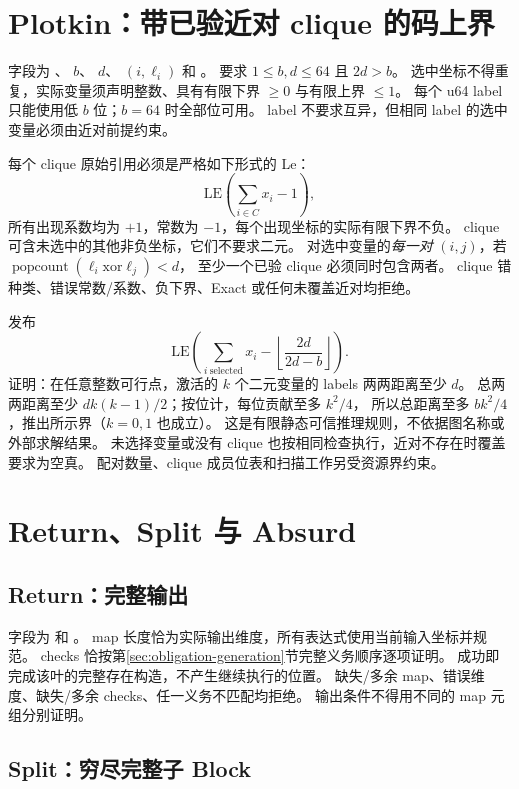 \section{Plotkin：带已验近对 clique 的码上界}
\label{ins:plotkin}

字段为 、 $b$、 $d$、
 $(i,\ell_i)$ 和 。
要求 $1\le b,d\le64$ 且 $2d>b$。
选中坐标不得重复，实际变量须声明整数、具有有限下界 $\ge0$ 与有限上界 $\le1$。
每个 u64 label 只能使用低 $b$ 位；$b=64$ 时全部位可用。
label 不要求互异，但相同 label 的选中变量必须由近对前提约束。

每个 clique 原始引用必须是严格如下形式的 Le：
\[
 \mathrm{LE}\left(\sum_{i\in C}x_i-1\right),
\]
所有出现系数均为 $+1$，常数为 $-1$，每个出现坐标的实际有限下界不负。
clique 可含未选中的其他非负坐标，它们不要求二元。
对选中变量的\emph{每一对} $(i,j)$，若
$\operatorname{popcount}(\ell_i\mathbin{\mathrm{xor}}\ell_j)<d$，
至少一个已验 clique 必须同时包含两者。
clique 错种类、错误常数/系数、负下界、Exact 或任何未覆盖近对均拒绝。

发布
\[
 \mathrm{LE}\left(\sum_{i\ \mathrm{selected}}x_i-
 \left\lfloor\frac{2d}{2d-b}\right\rfloor\right).
\]
证明：在任意整数可行点，激活的 $k$ 个二元变量的 labels 两两距离至少 $d$。
总两两距离至少 $dk(k-1)/2$；按位计，每位贡献至多 $k^2/4$，
所以总距离至多 $bk^2/4$，推出所示界（$k=0,1$ 也成立）。
这是有限静态可信推理规则，不依据图名称或外部求解结果。
未选择变量或没有 clique 也按相同检查执行，近对不存在时覆盖要求为空真。
配对数量、clique 成员位表和扫描工作另受资源界约束。

\section{Return、Split 与 Absurd}

\subsection{Return：完整输出}
\label{ins:return}
\label{ins:ret}

字段为  和 。
map 长度恰为实际输出维度，所有表达式使用当前输入坐标并规范。
checks 恰按第\ref{sec:obligation-generation}节完整义务顺序逐项证明。
成功即完成该叶的完整存在构造，不产生继续执行的位置。
缺失/多余 map、错误维度、缺失/多余 checks、任一义务不匹配均拒绝。
输出条件不得用不同的 map 元组分别证明。

\subsection{Split：穷尽完整子 Block}
\label{ins:split}
\label{ins:split-sign}
\label{ins:split-int-thr}

